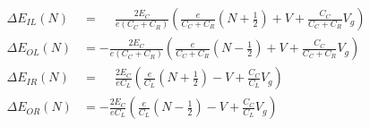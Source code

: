 \documentclass[../main.tex]{subfiles}
\begin{document}
\begin{align}
    \Delta E_{IL}(N) &= \phantom{-}\frac{2E_{C}}{e(C_{C} + C_{R})}\left(\frac{e}{C_{C} + C_{R}}\left(N + \frac{1}{2}\right) + V + \frac{C_{C}}{C_{C} + C_{R}}V_{g}\right)\\
    \Delta E_{OL}(N) &= -\frac{2E_{C}}{e(C_{C} + C_{R})}\left(\frac{e}{C_{C} + C_{R}}\left(N - \frac{1}{2}\right) + V + \frac{C_{C}}{C_{C} + C_{R}}V_{g}\right)\\
    \Delta E_{IR}(N) &= \phantom{-}\frac{2E_{C}}{eC_{L}}               \left(\frac{e}{C_{L}}\left(N + \frac{1}{2}\right) - V + \frac{C_{C}}{C_{L}}V_{g}\right)\\
    \Delta E_{OR}(N) &= -\frac{2E_{C}}{eC_{L}}               \left(\frac{e}{C_{L}}\left(N - \frac{1}{2}\right) - V + \frac{C_{C}}{C_{L}}V_{g}\right)
\end{align}
\end{document}
